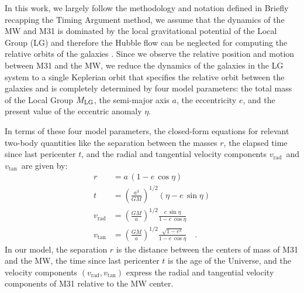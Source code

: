 \documentclass[twocolumn]{aastex631}
\newcommand{\mlg}{\ensuremath{M_{\rm LG}}}
\newcommand{\vtan}{\ensuremath{v_\textrm{tan}}}
\newcommand{\vrad}{\ensuremath{v_\textrm{rad}}}
\begin{document}
In this work, we largely follow the methodology and notation defined in
\citet{Penarrubia2016}
Briefly recapping the Timing Argument method, we assume that the dynamics of the
MW and M31 is dominated by the local gravitational potential of the Local Group
(LG) and therefore the Hubble flow can be neglected for computing the relative
orbits of the galaxies \citep[see, e.g.,][]{Penarrubia2014}.
Since we observe the relative position and motion between M31 and the MW, we
reduce the dynamics of the galaxies in the LG system to a single Keplerian orbit
that specifies the relative orbit between the galaxies and is completely
determined by four model parameters: the total mass of the Local Group \mlg, the
semi-major axis $a$, the eccentricity $e$, and the present value of the
eccentric anomaly $\eta$.

In terms of these four model parameters, the closed-form equations for relevant
two-body quantities like the separation between the masses $r$, the elapsed time
since last pericenter $t$, and the radial and tangential velocity components
\vrad\ and \vtan\ are given by:
\begin{align}
  r &= a \, (1-e\,\cos\eta) \label{eq:r} \\
  t &= \left( \frac{a^3}{GM} \right)^{1/2}(\eta-e\,\sin\eta) \label{eq:t} \\
  \vrad &= \left( \frac{GM}{a} \right)^{1/2} \frac{e\,\sin\eta}{1-e\,\cos\eta} \label{eq:vrad} \\
  \vtan &= \left( \frac{GM}{a} \right)^{1/2} \frac{\sqrt{1-e^2}}{1-e\,\cos\eta} \label{eq:vtan} \quad .
\end{align}
In our model, the separation $r$ is the distance between the centers of mass of
M31 and the MW, the time since last pericenter $t$ is the age of the Universe,
and the velocity components $(\vrad, \vtan)$ express the radial and tangential
velocity components of M31 relative to the MW center.
\end{document}
